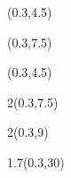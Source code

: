 \begin{textblock*}{\paperwidth}(0.3\TPHorizModule,4.5\TPVertModule)
  \titlefmt
\end{textblock*}

\begin{textblock*}{\paperwidth}(0.3\TPHorizModule,7.5\TPVertModule)
  \authorfmt
\end{textblock*}

\null\cleardoublepage


\begin{textblock*}{\paperwidth}(0.3\TPHorizModule,4.5\TPVertModule)
  \titlefmt
\end{textblock*}

\begin{textblock*}{2\TPHorizModule}(0.3\TPHorizModule,7.5\TPVertModule)
  \authorfmt
\end{textblock*}

\begin{textblock*}{2\TPHorizModule}(0.3\TPHorizModule,9\TPVertModule)
  \affiliation
\end{textblock*}

\begin{textblock*}{1.7\TPHorizModule}(0.3\TPHorizModule,30\TPVertModule)
  \edition
\end{textblock*}
\endgroup

